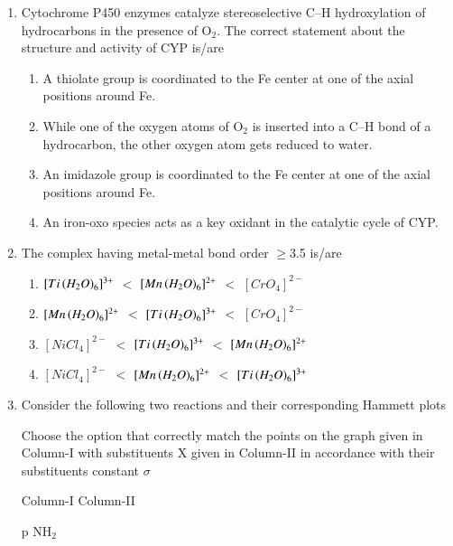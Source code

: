 \documentclass[journal,12pt,onecolumn]{IEEEtran}
\theoremstyle{remark}
\begin{document}
\begin{enumerate}
\item Cytochrome P450  enzymes catalyze stereoselective C$\text{--}$H hydroxylation of hydrocarbons in the presence of O$_{2}$. The correct statement about the structure and activity of CYP is/are
    \begin{enumerate}
        \item A thiolate group is coordinated to the Fe center at one of the axial positions around Fe.
        \item While one of the oxygen atoms of O$_{2}$ is inserted into a C$\text{--}$H bond of a hydrocarbon, the other oxygen atom gets reduced to water.
        \item An imidazole group is coordinated to the Fe center at one of the axial positions around Fe.
        \item An iron-oxo species acts as a key oxidant in the catalytic cycle of CYP.
    \end{enumerate}      \hfill{}
    \item The complex having metal-metal bond order $\ge$3.5 is/are

    \begin{enumerate}
     \item $[Ti\left(H_2O\right)_6]^{3+}$ $<$ $[Mn\left(H_2O\right)_6]^{2+}$ $<$ $[CrO_4]^{2-}$
    \item $[Mn\left(H_2O\right)_6]^{2+}$ $<$ $[Ti\left(H_2O\right)_6]^{3+}$ $<$ $[CrO_4]^{2-}$
    \item $[NiCl_4]^{2-}$ $<$ $[Ti\left(H_2O\right)_6]^{3+}$ $<$ $[Mn\left(H_2O\right)_6]^{2+}$
    \item $[NiCl_4]^{2-}$ $<$ $[Mn\left(H_2O\right)_6]^{2+}$ $<$ $[Ti\left(H_2O\right)_6]^{3+}$
    
    \end{enumerate}      \hfill{}



\item Consider the following two reactions and their corresponding Hammett plots

Choose the option that correctly match the points on the graph given in Column-I with substituents X given in Column-II in accordance with their substituents constant $\sigma$

Column-I  \quad Column-II 

p \quad NH$_{2}$


\end{enumerate}
\end{document}
